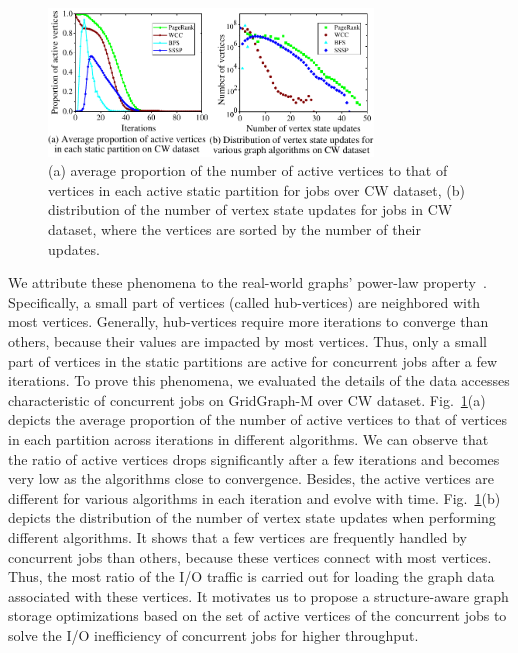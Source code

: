 \documentclass[10pt,journal,compsoc]{IEEEtran}
\begin{document}
\begin{figure}[!t]
	\centering
	\includegraphics[width=3.4in]{active_ratio_times.pdf}
	\vspace{-12pt}
	\caption{(a) average proportion of the number of active vertices to that of vertices in each active static partition for jobs over CW dataset, (b) distribution of the number of vertex state updates for jobs in CW dataset, where the vertices are sorted by the number of their updates.}
	\label{active_ratio_times}
	\vspace{-12pt}
\end{figure}

We attribute these phenomena to the real-world graphs' power-law property~\cite{PowerGraph}. Specifically, a small part of vertices (called hub-vertices) are neighbored with most vertices.
Generally, hub-vertices require more iterations to converge than others, because their values are impacted by most vertices.
Thus, only a small part of vertices in the static partitions are active for concurrent jobs after a few iterations.
To prove this phenomena, we evaluated the details of the data accesses characteristic of concurrent jobs on GridGraph-M over CW dataset.
Fig.~\ref{active_ratio_times}(a) depicts the average proportion of the number of active vertices to that of vertices in each partition across iterations in different algorithms.
We can observe that the ratio of active vertices drops significantly after a few iterations and becomes very low as the algorithms close to convergence. Besides, the active vertices are different for various algorithms in each iteration and evolve with time.
Fig.~\ref{active_ratio_times}(b) depicts the distribution of the number of vertex state updates when performing different algorithms.
It shows that a few vertices are frequently handled by concurrent jobs than others, because these vertices connect with most vertices.
Thus, the most ratio of the I/O traffic is carried out for loading the graph data associated with these vertices.
It motivates us to propose a structure-aware graph storage optimizations based on the set of active vertices of the concurrent jobs to solve the I/O inefficiency of concurrent jobs for higher throughput.
\end{document}
